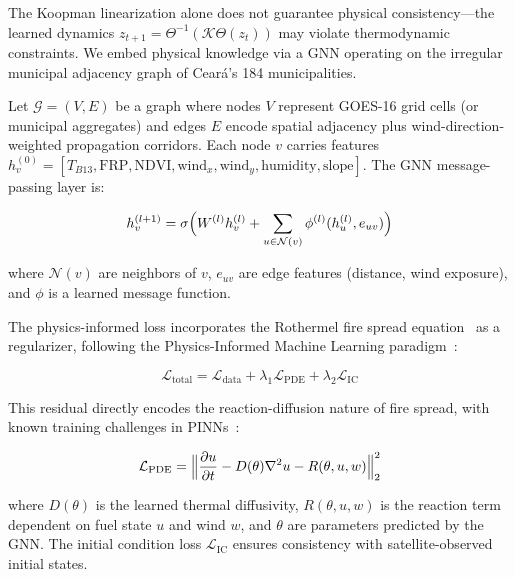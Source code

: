 \documentclass[11pt,twocolumn,a4paper]{article}
\newcommand{\abbrev}[1]{{\small\textsc{#1}}}
\newcommand{\sK}{\mathcal{K}}
\newcommand{\sG}{\mathcal{G}}
\begin{document}
The Koopman linearization alone does not guarantee physical consistency---the learned dynamics $z_{t+1} = \Theta^{-1}(\sK \Theta(z_t))$ may violate thermodynamic constraints. We embed physical knowledge via a \abbrev{GNN} operating on the irregular municipal adjacency graph of Cear\'{a}'s 184 municipalities.

Let $\sG = (V, E)$ be a graph where nodes $V$ represent GOES-16 grid cells (or municipal aggregates) and edges $E$ encode spatial adjacency plus wind-direction-weighted propagation corridors. Each node $v$ carries features $h_v^{(0)} = [T_{B13}, \text{FRP}, \text{NDVI}, \text{wind}_x, \text{wind}_y, \text{humidity}, \text{slope}]$. The \abbrev{GNN} message-passing layer is:

\begin{equation}
h_v^{(l+1)} = \sigma\Bigl(W^{(l)} h_v^{(l)} + \sum_{u \in \mathcal{N}(v)} \phi^{(l)}(h_u^{(l)}, e_{uv})\Bigr)
\label{eq:gnn_message}
\end{equation}

where $\mathcal{N}(v)$ are neighbors of $v$, $e_{uv}$ are edge features (distance, wind exposure), and $\phi$ is a learned message function.

The physics-informed loss incorporates the Rothermel fire spread equation~\cite{rothermel1983} as a regularizer, following the Physics-Informed Machine Learning paradigm~\cite{karniadakis2021,cuomo2022}:

\begin{equation}
\mathcal{L}_{\text{total}} = \mathcal{L}_{\text{data}} + \lambda_1 \mathcal{L}_{\text{PDE}} + \lambda_2 \mathcal{L}_{\text{IC}}
\label{eq:pinn_loss}
\end{equation}

This residual directly encodes the reaction-diffusion nature of fire spread, with known training challenges in PINNs~\cite{wang2021_gradient,krishnapriyan2021}:

\begin{equation}
\mathcal{L}_{\text{PDE}} = \Bigl\| \frac{\partial u}{\partial t} - D(\theta) \nabla^2 u - R(\theta, u, w) \Bigr\|_2^2
\label{eq:pde_residual}
\end{equation}

where $D(\theta)$ is the learned thermal diffusivity, $R(\theta, u, w)$ is the reaction term dependent on fuel state $u$ and wind $w$, and $\theta$ are parameters predicted by the \abbrev{GNN}. The initial condition loss $\mathcal{L}_{\text{IC}}$ ensures consistency with satellite-observed initial states.
\end{document}
